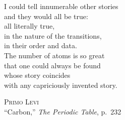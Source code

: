 \newpage
\renewcommand{\epigraphflush}{center}
\renewcommand{\sourceflush}{flushright}
\setlength{}
\vspace*{\fill}
\epigraph{
I could tell innumerable other stories \\
and they would all be true: \\
all literally true, \\
in the nature of the transitions, \\
in their order and data. \\
The number of atoms is so great \\
that one could always be found \\
whose story coincides \\
with any capriciously invented story.}%
{\vspace{0.25\baselineskip}
\textsc{Primo Levi} \\
``Carbon,'' \textit{The Periodic Table}, p.~232~\cite{LeviBook}}


%
